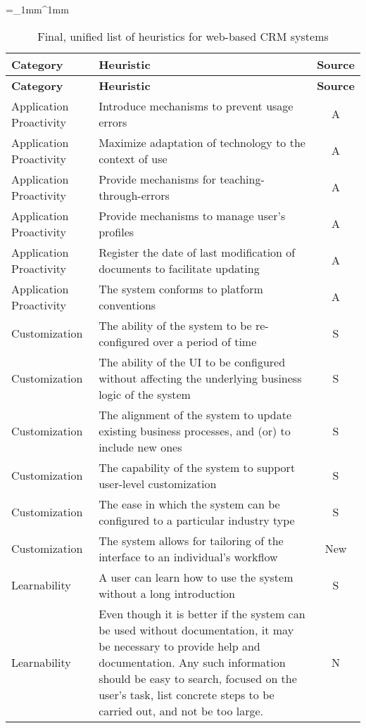 \begin{singlespace}
		\tabulinesep=_1mm^1mm
	\begin{longtabu} to \textwidth {l X[1, p] c}
			\caption{Final, unified list of heuristics for web-based CRM systems}\\
			\toprule
			\textbf{Category} & \textbf{Heuristic} & \textbf{Source} \\
			\midrule
		\endfirsthead
			
			\textbf{Category} & \textbf{Heuristic} & \textbf{Source} \\
			\midrule
		\endhead
		
			\bottomrule
		\endlastfoot
		
		Application Proactivity & Introduce mechanisms to prevent usage errors & A \\
		Application Proactivity & Maximize adaptation of technology to the context of use & A \\
		Application Proactivity & Provide mechanisms for teaching-through-er\-rors & A \\
		Application Proactivity & Provide mechanisms to manage user's profiles & A \\
		Application Proactivity & Register the date of last modification of documents to facilitate updating & A \\
		Application Proactivity & The system conforms to platform conventions & A \\
		Customization & The ability of the system to be re-configured over a period of time & S \\
		Customization & The ability of the UI to be configured without affecting the underlying business logic of the system & S \\
		Customization & The alignment of the system to update existing business processes, and (or) to include new ones & S \\
		Customization & The capability of the system to support user-level customization & S \\
		Customization & The ease in which the system can be configured to a particular industry type & S \\
		Customization & The system allows for tailoring of the interface to an individual's workflow & New \\
		Learnability & A user can learn how to use the system without a long introduction & S \\
		Learnability & Even though it is better if the system can be used without documentation, it may be necessary to provide help and documentation. Any such information should be easy to search, focused on the user's task, list concrete steps to be carried out, and not be too large. & N \\

\end{longtabu}
\end{singlespace}
